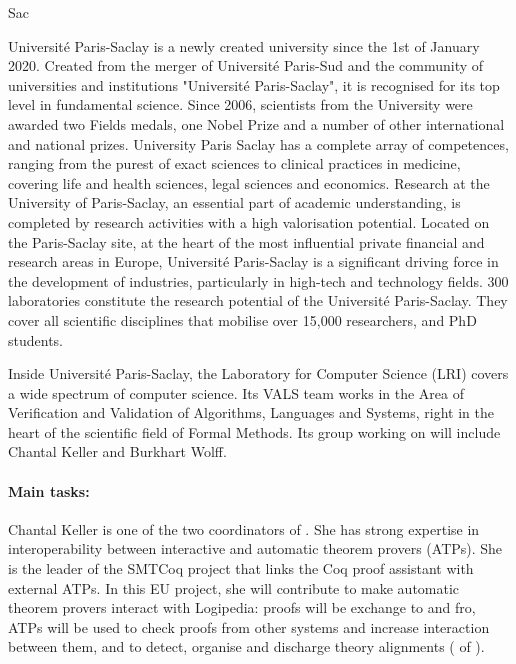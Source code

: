 \begin{sitedescription}{Sac}


Université Paris-Saclay is a newly created university since the 1st of
January 2020. Created from the merger of Université Paris-Sud and the
community of universities and institutions "Université Paris-Saclay", it
is recognised for its top level in fundamental science.  Since 2006,
scientists from the University were awarded two Fields medals, one Nobel
Prize and a number of other international and national prizes.
University Paris Saclay has a complete array of competences, ranging
from the purest of exact sciences to clinical practices in medicine,
covering life and health sciences, legal sciences and economics.
Research at the University of Paris-Saclay, an essential part of
academic understanding, is completed by research activities with a high
valorisation potential. Located on the Paris-Saclay site, at the heart
of the most influential private financial and research areas in Europe,
Université Paris-Saclay is a significant driving force in the
development of industries, particularly in high-tech and technology
fields. 300 laboratories constitute the research potential of the
Université Paris-Saclay. They cover all scientific disciplines that
mobilise over 15,000 researchers, and PhD students.

Inside Université Paris-Saclay, the Laboratory for Computer Science
(LRI) covers a wide spectrum of computer science. Its VALS team works in
the Area of Verification and Validation of Algorithms, Languages and
Systems, right in the heart of the scientific field of Formal Methods.
Its group working on \pn will include Chantal Keller and Burkhart Wolff.

\paragraph*{Main tasks:}

\begin{compactitem}
\item Chantal Keller is one of the two coordinators of . She has
strong expertise in interoperability between interactive and automatic
theorem provers (ATPs). She is the leader of the SMTCoq project that
links the Coq proof assistant with external ATPs. In this EU project,
she will contribute to make automatic theorem provers interact with
Logipedia: proofs will be exchange to and fro, ATPs will be used to
check proofs from other systems and increase interaction between them,
and to detect, organise and discharge theory alignments
( of ).


\end{compactitem}
\end{sitedescription}
